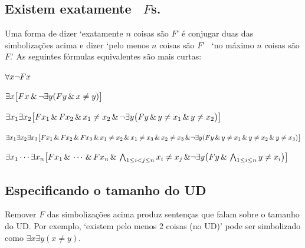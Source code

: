 \subsection*{Existem exatamente \blank\ $F$s.}
\label{summary.exactly}

Uma forma de dizer `exatamente $n$ coisas são $F$' é conjugar duas das simbolizações acima e dizer `pelo menos $n$ coisas são $F$' \eand\ `no máximo $n$ coisas são $F$.' As seguintes fórmulas equivalentes são mais curtas:
\begin{ekey}
\item[zero] $\forall x\neg Fx$
\item[um] $\exists x\bigl[Fx \,\&\, \neg\exists y(Fy \,\&\, x\neq y)\bigr]$
\item[dois] $\exists x_1\exists x_2\bigl[Fx_1 \,\&\, Fx_2 \,\&\, x_1 \neq x_2 \,\&\, \neg\exists y\bigl(Fy \,\&\, y\neq x_1 \,\&\, y \neq x_2\bigr) \bigr]$
\item[três] $\exists x_1\exists x_2\exists x_3\bigl[Fx_1 \,\&\, Fx_2 \,\&\, Fx_3 \,\&\, x_1 \neq x_2 \,\&\, x_1 \neq x_3 \,\&\, x_2 \neq x_3 \,\&\,\\
\neg\exists y(Fy \,\&\, y \neq x_1 \,\&\, y \neq x_2 \,\&\, y\neq x_3) \bigr]$
\item[n] $\exists x_1\cdots\exists x_n\bigl[Fx_1 \,\&\,\cdots\,\&\, Fx_n \,\&\, \bigwedge_{1\leq i<j\leq n}x_i\neq x_j \,\&\,\\
 \neg\exists y\bigl(Fy \,\&\, \bigwedge_{1\leq i\leq n}y\neq x_i\bigr)\bigr]$
\end{ekey}

\subsection*{Especificando o tamanho do UD}

Remover $F$ das simbolizações acima produz sentenças que falam sobre o tamanho do UD. Por exemplo, `existem pelo menos 2 coisas (no UD)' pode ser simbolizado como $\exists x\exists y(x \neq y)$.

